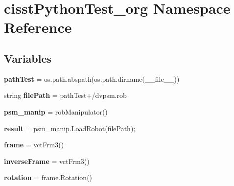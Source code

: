 \hypertarget{namespacecisstPythonTest__org}{}\section{cisst\+Python\+Test\+\_\+org Namespace Reference}
\label{namespacecisstPythonTest__org}
\subsection*{Variables}
\begin{DoxyCompactItemize}
\item 
{\bfseries path\+Test} = os.\+path.\+abspath(os.\+path.\+dirname(\+\_\+\+\_\+file\+\_\+\+\_\+))\hypertarget{namespacecisstPythonTest__org_af3233e1c2e5d9370e8460ae54f36423e}{}\label{namespacecisstPythonTest__org_af3233e1c2e5d9370e8460ae54f36423e}

\item 
string {\bfseries file\+Path} = path\+Test+\textquotesingle{}/dvpsm.\+rob\textquotesingle{}\hypertarget{namespacecisstPythonTest__org_adcdd08a5ecc324b8cddfbf6722947a86}{}\label{namespacecisstPythonTest__org_adcdd08a5ecc324b8cddfbf6722947a86}

\item 
{\bfseries psm\+\_\+manip} = rob\+Manipulator()\hypertarget{namespacecisstPythonTest__org_ab8b5ca2eda799d43df69d18ddc2b66e8}{}\label{namespacecisstPythonTest__org_ab8b5ca2eda799d43df69d18ddc2b66e8}

\item 
{\bfseries result} = psm\+\_\+manip.\+Load\+Robot(file\+Path);\hypertarget{namespacecisstPythonTest__org_a005edc7b8c8c8340568c4d0d52aeefa9}{}\label{namespacecisstPythonTest__org_a005edc7b8c8c8340568c4d0d52aeefa9}

\item 
{\bfseries frame} = vct\+Frm3()\hypertarget{namespacecisstPythonTest__org_a7a3122d21c55a3ab128b887e8bd56690}{}\label{namespacecisstPythonTest__org_a7a3122d21c55a3ab128b887e8bd56690}

\item 
{\bfseries inverse\+Frame} = vct\+Frm3()\hypertarget{namespacecisstPythonTest__org_a9ec58f9e01ca8ebb052d2b9a6c781e25}{}\label{namespacecisstPythonTest__org_a9ec58f9e01ca8ebb052d2b9a6c781e25}

\item 
{\bfseries rotation} = frame.\+Rotation()\hypertarget{namespacecisstPythonTest__org_a0a62dd3b82932a38a3e82c80e7bb2088}{}\label{namespacecisstPythonTest__org_a0a62dd3b82932a38a3e82c80e7bb2088}


\end{DoxyCompactItemize}
